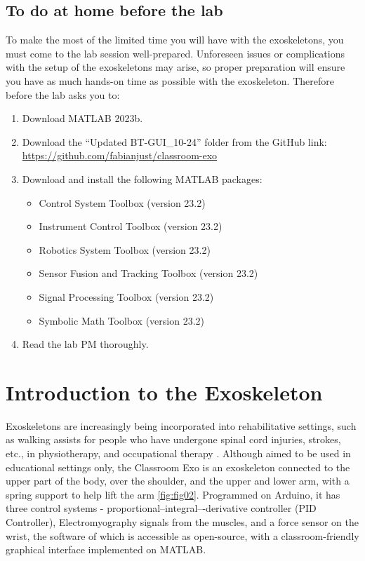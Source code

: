 \subsection{To do at home before the lab}
To make the most of the limited time you will have with the exoskeletons, you must come to the lab session well-prepared. Unforeseen issues or complications with the setup of the exoskeletons may arise, so proper preparation will ensure you have as much hands-on time as possible with the exoskeleton. Therefore before the lab asks you to: 
\begin{enumerate}[]
	\item Download MATLAB 2023b.
	\item Download the “Updated BT-GUI\_10-24”  folder from the GitHub link: \url{https://github.com/fabianjust/classroom-exo}
	\item Download and install the following MATLAB packages: 
	\begin{itemize}[]
		\item Control System Toolbox (version 23.2)
		\item Instrument Control Toolbox (version 23.2)
		\item Robotics System Toolbox (version 23.2)
		\item Sensor Fusion and Tracking Toolbox (version 23.2)
		\item Signal Processing Toolbox (version 23.2)
		\item Symbolic Math Toolbox (version 23.2)
	\end{itemize}
	\item Read the lab PM thoroughly.
\end{enumerate}


\newpage
	
\section{Introduction to the Exoskeleton}
Exoskeletons are increasingly being incorporated into rehabilitative settings, such as walking assists for people who have undergone spinal cord injuries, strokes, etc., in physiotherapy, and occupational therapy \cite{Hill2017}. Although aimed to be used in educational settings only, the Classroom Exo is an exoskeleton connected to the upper part of the body, over the shoulder, and the upper and lower arm, with a spring support to help lift the arm \autoref{fig:fig02}. Programmed on Arduino, it has three control systems - proportional–integral–-derivative controller (PID Controller), Electromyography signals from the muscles, and a force sensor on the wrist, the software of which is accessible as open-source, with a classroom-friendly graphical interface implemented on MATLAB. 

